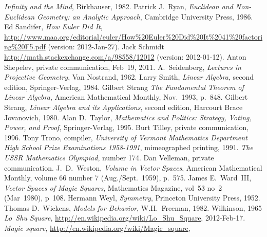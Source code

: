 \begin{thebibliography}{\makebox[2em][c]{{}\hfil{}}}
  \emph{Infinity and the Mind},
  Birkhauser,
  1982.
  Patrick J.~Ryan,
  \emph{Euclidean and Non-Euclidean Geometry: an Analytic Approach},
  Cambridge University Press, 1986.
  Ed Sandifer,
  \textit{How Euler Did It},
  \url{http://www.maa.org/editorial/euler/How%20Euler%20Did%20It%2041%20factoring%20F5.pdf} (version: 2012-Jan-27).
  Jack Schmidt %
  \url{http://math.stackexchange.com/a/98558/12012} (version: 2012-01-12).
  Anton Shepelev,
  private communication,
  Feb~19, 2011.
  A.~Seidenberg,
  \emph{Lectures in Projective Geometry},
  Van Nostrand, 1962.
  Larry Smith,
  \emph{Linear Algebra},
  second edition,
  Springer-Verlag,
  1984.
  Gilbert Strang
  \emph{The Fundamental Theorem of Linear Algebra},
  American Mathematical Monthly,
  Nov.~1993, p.~848.
  Gilbert Strang,
  \emph{Linear Algebra and its Applications},
  second edition,
  Harcourt Brace Jovanovich,
  1980.
  Alan D.~Taylor,
  \emph{Mathematics and Politics: Strategy, Voting, Power, and Proof},
  Springer-Verlag,
  1995.
  Burt Tilley,
  private communication,
  1996.
  Tony Trono, compiler,
  \emph{University of Vermont Mathematics Department High School Prize
    Examinations 1958-1991},
  mimeographed printing, 1991.
  \emph{The USSR Mathematics Olympiad},
   number 174.
  Dan Velleman,
  private communication.
  J.~D.\ Weston,
  \emph{Volume in Vector Spaces},
  American Mathematical Monthly,
  volume 66 number 7 (Aug./Sept.\ 1959),
  p.~575.
  James E.\ Ward~III,
  \emph{Vector Spaces of Magic Squares},
  Mathematics Magazine,
  vol~53 no~2 (Mar~1980),
  p~108.
  Hermann Weyl,
  \emph{Symmetry},
  Princeton University Press,
  1952.
  Thomas D.~Wickens,
  \emph{Models for Behavior},
  W.H.~Freeman,
  1982.
  Wilkinson,
  1965
  \emph{Lo~Shu Square},
  \url{http://en.wikipedia.org/wiki/Lo_Shu_Square},
  2012-Feb-17.
  \emph{Magic square},
  \url{http://en.wikipedia.org/wiki/Magic_square},

\end{thebibliography}
